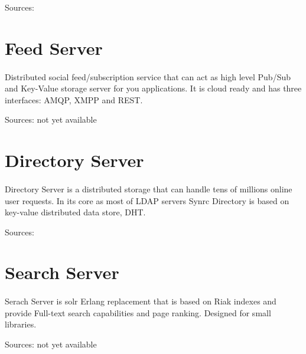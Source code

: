 \documentclass[11pt]{article}
\begin{document}
Sources: 


\section*{Feed Server}
\paragraph{}
Distributed social feed/subscription service that can act as high level Pub/Sub
and Key-Value storage server for you applications. It is cloud ready and has
three interfaces: AMQP, XMPP and REST.

Sources: not yet available

\section*{Directory Server}
\paragraph{}
Directory Server is a distributed storage that can handle tens of
millions online user requests. 
In its core as most of LDAP servers Synrc Directory is based on
key-value distributed data store, DHT.

Sources: 

\section*{Search Server}
\paragraph{}
Serach Server is solr Erlang replacement that is based on Riak indexes
and provide Full-text search capabilities and page ranking. Designed for small
libraries.

Sources: not yet available
\end{document}
